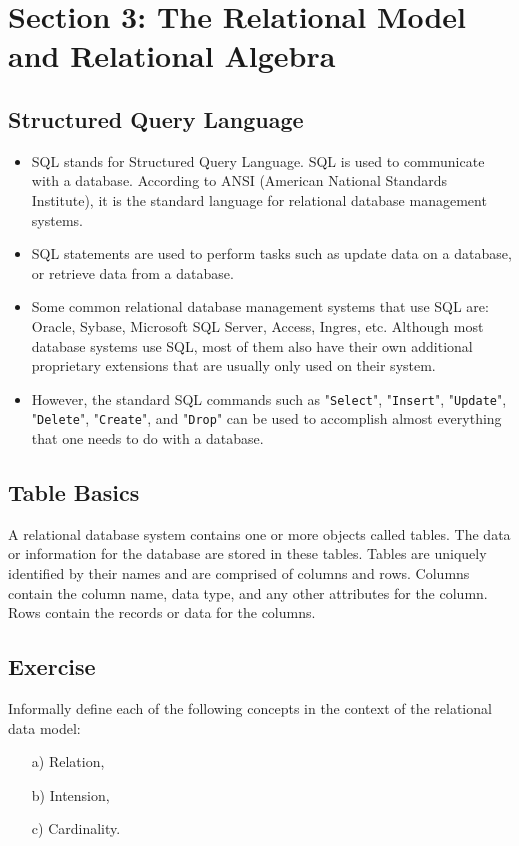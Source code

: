 \documentclass[]{article}
\begin{document}
\newpage

\section{Section 3: The Relational Model and Relational Algebra}

\subsection{Structured Query Language}
\begin{itemize}
\item SQL stands for Structured Query Language. SQL is used to communicate with a database. According to ANSI (American National Standards Institute), it is the standard language for relational database management systems. \item SQL statements are used to perform tasks such as update data on a database, or retrieve data from a database. 
\item Some common relational database management systems that use SQL are: Oracle, Sybase, Microsoft SQL Server, Access, Ingres, etc. Although most database systems use SQL, most of them also have their own additional proprietary extensions that are usually only used on their system. \item However, the standard SQL commands such as "\texttt{Select}", "\texttt{Insert}", "\texttt{Update}", "\texttt{Delete}", "\texttt{Create}", and "\texttt{Drop}" can be used to accomplish almost everything that one needs to do with a database. 
\end{itemize}

\subsection{Table Basics}

A relational database system contains one or more objects called tables. The data or information for the database are stored in these tables. Tables are uniquely identified by their names and are comprised of columns and rows. Columns contain the column name, data type, and any other attributes for the column. Rows contain the records or data for the columns. 

\subsection{Exercise}
Informally define each of the following concepts in the context of the relational data model:
\begin{itemize}
\item[a)] Relation,							
\item[b)] Intension, 									
\item[c)] Cardinality.							
\end{itemize}
\end{document}
